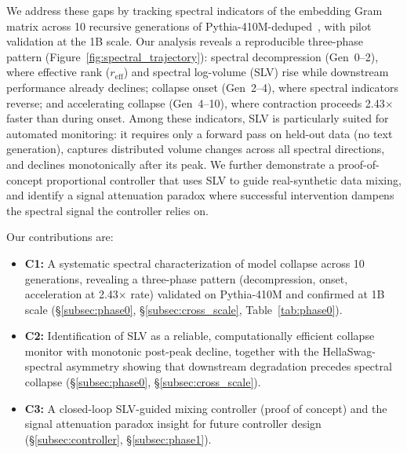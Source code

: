 We address these gaps by tracking spectral indicators of the embedding Gram matrix across 10 recursive generations of Pythia-410M-deduped~\cite{biderman2023pythia}, with pilot validation at the 1B scale.
Our analysis reveals a reproducible three-phase pattern (Figure~\ref{fig:spectral_trajectory}): spectral decompression (Gen~0--2), where effective rank ($r_{\text{eff}}$) and spectral log-volume (SLV) rise while downstream performance already declines; collapse onset (Gen~2--4), where spectral indicators reverse; and accelerating collapse (Gen~4--10), where contraction proceeds 2.43$\times$ faster than during onset.
Among these indicators, SLV is particularly suited for automated monitoring: it requires only a forward pass on held-out data (no text generation), captures distributed volume changes across all spectral directions, and declines monotonically after its peak.
We further demonstrate a proof-of-concept proportional controller that uses SLV to guide real-synthetic data mixing, and identify a signal attenuation paradox where successful intervention dampens the spectral signal the controller relies on.

Our contributions are:
\begin{itemize}
\item \textbf{C1:} A systematic spectral characterization of model collapse across 10 generations, revealing a three-phase pattern (decompression, onset, acceleration at 2.43$\times$ rate) validated on Pythia-410M and confirmed at 1B scale (\S\ref{subsec:phase0}, \S\ref{subsec:cross_scale}, Table~\ref{tab:phase0}).
\item \textbf{C2:} Identification of SLV as a reliable, computationally efficient collapse monitor with monotonic post-peak decline, together with the HellaSwag-spectral asymmetry showing that downstream degradation precedes spectral collapse (\S\ref{subsec:phase0}, \S\ref{subsec:cross_scale}).
\item \textbf{C3:} A closed-loop SLV-guided mixing controller (proof of concept) and the signal attenuation paradox insight for future controller design (\S\ref{subsec:controller}, \S\ref{subsec:phase1}).
\end{itemize}